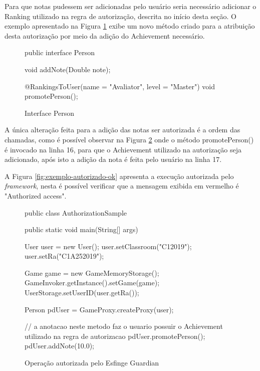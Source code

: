 \par Para que notas pudessem ser adicionadas pelo usuário seria necessário adicionar o Ranking utilizado na regra de autorização, descrita no início desta seção. O exemplo apresentado na Figura \ref{fig:autorizacao-ok} exibe um novo método criado para a atribuição desta autorização por meio da adição do Achievement necessário.

\begin{figure}[H]
    \centering
    \caption{Interface Person}
    \begin{java}
public interface Person {

	void addNote(Double note);

	@RankingsToUser(name = "Avaliator", level = "Master")
	void promotePerson();
}
    \end{java}
    \label{fig:autorizacao-ok}
\end{figure}

\par A única alteração feita para a adição das notas ser autorizada é a ordem das chamadas, como é possível observar na Figura \ref{fig:hellow-world-gamification-autorizada} onde o método promotePerson() é invocado na linha 16, para que o Achievement utilizado na autorização seja adicionado, após isto a adição da nota é feita pelo usuário na linha 17.

\par A Figura \ref{fig:exemplo-autorizado-ok} apresenta a execução autorizada pelo \textit{framework}, nesta é possível verificar que a mensagem exibida em vermelho é "Authorized access".

\begin{figure}[H]
    \centering
    \caption{Operação autorizada pelo Esfinge Guardian}
    \begin{java}
public class AuthorizationSample {

	public static void main(String[] args) {

		User user = new User();
		user.setClassroom("C12019");
		user.setRa("C1A252019");
		
		Game game = new GameMemoryStorage();
    	GameInvoker.getInstance().setGame(game);
		UserStorage.setUserID(user.getRa());

		Person pdUser = GameProxy.createProxy(user);
		
		// a anotacao neste metodo faz o usuario possuir o Achievement utilizado na regra de autorizacao
		pdUser.promotePerson();
		pdUser.addNote(10.0);
	}
}
    \end{java}
    \label{fig:hellow-world-gamification-autorizada}
\end{figure}


